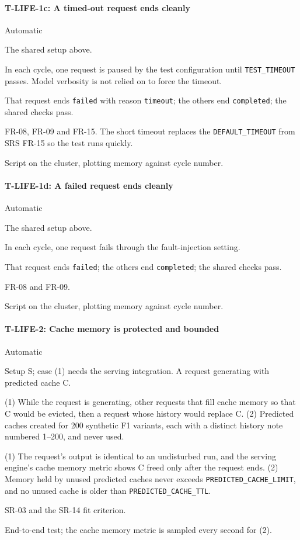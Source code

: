 \documentclass[12pt, titlepage]{article}
\newenvironment{testcase}[2]
  {\Needspace{8\baselineskip}\paragraph{#1: #2}\phantomsection\label{test:#1}\sloppy
   \begin{description}[style=sameline, leftmargin=3.6cm, labelwidth=3.4cm,
     font=\normalfont\bfseries, itemsep=2pt, topsep=2pt]}
  {\end{description}}
\newcommand{\cst}[1]{\texttt{#1}}
\begin{document}
\begin{testcase}{T-LIFE-1c}{A timed-out request ends cleanly}
\item[Control] Automatic
\item[Initial state] The shared setup above.
\item[Input] In each cycle, one request is paused by the test configuration
until \cst{TEST\_TIMEOUT} passes. Model verbosity is not relied on to force
the timeout.
\item[Output] That request ends \texttt{failed} with reason
\texttt{timeout}; the others end \texttt{completed}; the shared checks
pass.
\item[Derivation] FR-08, FR-09 and FR-15. The short timeout replaces the
\cst{DEFAULT\_TIMEOUT} from SRS FR-15 so the test runs quickly.
\item[How performed] Script on the cluster, plotting memory against cycle
number.
\end{testcase}

\begin{testcase}{T-LIFE-1d}{A failed request ends cleanly}
\item[Control] Automatic
\item[Initial state] The shared setup above.
\item[Input] In each cycle, one request fails through the fault-injection
setting.
\item[Output] That request ends \texttt{failed}; the others end
\texttt{completed}; the shared checks pass.
\item[Derivation] FR-08 and FR-09.
\item[How performed] Script on the cluster, plotting memory against cycle
number.
\end{testcase}

\begin{testcase}{T-LIFE-2}{Cache memory is protected and bounded}
\item[Control] Automatic
\item[Initial state] Setup S; case (1) needs the serving integration. A
request generating with predicted cache C.
\item[Input] (1) While the request is generating, other requests that
fill cache memory so that C would be evicted, then a request whose history
would replace C. (2) Predicted caches created for 200 synthetic F1 variants, each with
a distinct history note numbered 1--200, and never used.
\item[Output] (1) The request's output is identical to an undisturbed run,
and the serving engine's cache memory metric shows C freed only after the
request ends. (2) Memory held by unused
predicted caches never exceeds \cst{PREDICTED\_CACHE\_LIMIT}, and no unused
cache is older than \cst{PREDICTED\_CACHE\_TTL}.
\item[Derivation] SR-03 and the SR-14 fit criterion.
\item[How performed] End-to-end test; the cache memory metric is sampled every
second for (2).
\end{testcase}
\end{document}
